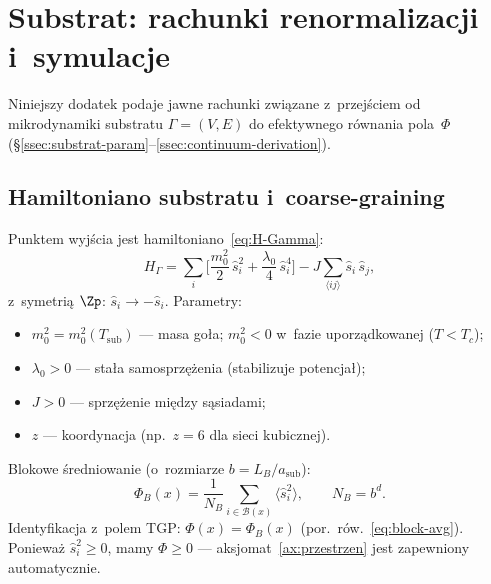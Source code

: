 \section{Substrat: rachunki renormalizacji i~symulacje}%
\label{app:substrat}

Niniejszy dodatek podaje jawne rachunki zwi\k{a}zane z~przej\'sciem
od mikrodynamiki substratu $\Gamma = (V, E)$ do efektywnego
r\'ownania pola~$\Phi$ (\S\ref{ssec:substrat-param}--\ref{ssec:continuum-derivation}).

\subsection{Hamiltoniano substratu i~coarse-graining}%
\label{app:B-hamiltoniano}

Punktem wyj\'scia jest hamiltoniano~\eqref{eq:H-Gamma}:
\begin{equation}\label{eq:B-H}
  H_\Gamma = \sum_i \biggl[
    \frac{m_0^2}{2}\,\hat{s}_i^2
    + \frac{\lambda_0}{4}\,\hat{s}_i^4
  \biggr]
  - J\sum_{\langle ij\rangle} \hat{s}_i\,\hat{s}_j,
\end{equation}
z~symetri\k{a} $\Zp$: $\hat{s}_i \to -\hat{s}_i$.
Parametry:
\begin{itemize}[nosep]
  \item $m_0^2 = m_0^2(T_{\mathrm{sub}})$ --- masa go\l{}a;
    $m_0^2 < 0$ w~fazie uporz\k{a}dkowanej ($T < T_c$);
  \item $\lambda_0 > 0$ --- sta\l{}a samosprz\k{e}\.zenia
    (stabilizuje potencja\l{});
  \item $J > 0$ --- sprz\k{e}\.zenie mi\k{e}dzy s\k{a}siadami;
  \item $z$ --- koordynacja (np.\ $z = 6$ dla sieci kubicznej).
\end{itemize}

Blokowe \'sredniowanie (o~rozmiarze $b = L_B / a_{\mathrm{sub}}$):
\begin{equation}\label{eq:B-block}
  \Phi_B(x) = \frac{1}{N_B} \sum_{i \in \mathcal{B}(x)}
  \langle \hat{s}_i^2 \rangle,
  \qquad
  N_B = b^d.
\end{equation}
Identyfikacja z~polem TGP:
$\Phi(x) = \Phi_B(x)$
(por.\ r\'ow.~\ref{eq:block-avg}).
Poniewa\.z $\hat{s}_i^2 \geq 0$, mamy $\Phi \geq 0$ ---
aksjomat~\ref{ax:przestrzen} jest zapewniony automatycznie.

